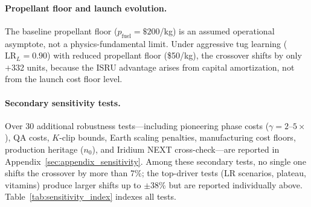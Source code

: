 \documentclass[preprint,12pt]{elsarticle}
\begin{document}
\paragraph{Propellant floor and launch evolution.} The baseline propellant floor ($p_{\mathrm{fuel}} = \$200$/kg) is an assumed operational asymptote, not a physics-fundamental limit. Under aggressive tug learning ($\mathrm{LR}_L = 0.90$) with reduced propellant floor (\$50/kg), the crossover shifts by only $+$332 units, because the ISRU advantage arises from capital amortization, not from the launch cost floor level.

\paragraph{Secondary sensitivity tests.} Over 30 additional robustness tests---including pioneering phase costs ($\gamma = 2$--$5\times$), QA costs, $K$-clip bounds, Earth scaling penalties, manufacturing cost floors, production heritage ($n_0$), and Iridium NEXT cross-check---are reported in Appendix~\ref{sec:appendix_sensitivity}. Among these secondary tests, no single one shifts the crossover by more than 7\%; the top-driver tests (LR scenarios, plateau, vitamins) produce larger shifts up to $\pm$38\% but are reported individually above. Table~\ref{tab:sensitivity_index} indexes all tests.
\end{document}
